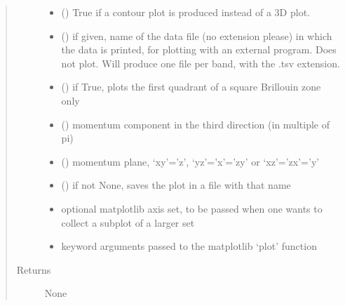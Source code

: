 \documentclass[letterpaper,10pt,english]{sphinxmanual}
\begin{document}
\begin{fulllineitems}
\begin{quote}
\begin{description}
\begin{itemize}
\item {} 
\sphinxAtStartPar
{} () \textendash{} True if a contour plot is produced instead of a 3D plot.

\item {} 
\sphinxAtStartPar
{} () \textendash{} if given, name of the data file (no extension please) in which the data is printed, for plotting with an external program. Does not plot. Will produce one file per band, with the .tsv extension.

\item {} 
\sphinxAtStartPar
{} () \textendash{} if True, plots the first quadrant of a square Brillouin zone only

\item {} 
\sphinxAtStartPar
{} () \textendash{} momentum component in the third direction (in multiple of pi)

\item {} 
\sphinxAtStartPar
{} () \textendash{} momentum plane, ‘xy’=’z’, ‘yz’=’x’=’zy’ or ‘xz’=’zx’=’y’

\item {} 
\sphinxAtStartPar
{} () \textendash{} if not None, saves the plot in a file with that name

\item {} 
\sphinxAtStartPar
{} \textendash{} optional matplotlib axis set, to be passed when one wants to collect a subplot of a larger set

\item {} 
\sphinxAtStartPar
{} \textendash{} keyword arguments passed to the matplotlib ‘plot’ function

\end{itemize}

\item[{Returns}] \leavevmode
\sphinxAtStartPar
None

\end{description}\end{quote}

\end{fulllineitems}
\end{document}
